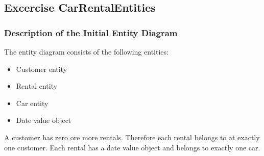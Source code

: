 \label{cha:design_of_data_and_functionality}

\subsection{Excercise CarRentalEntities}
\label{sec:exercise_car_rental_entities}
\subsubsection*{Description of the Initial Entity Diagram}
The entity diagram consists of the following entities:
\begin{itemize}
    \item Customer entity
    \item Rental entity
    \item Car entity
    \item Date value object
\end{itemize}
A customer has zero ore more rentals.
Therefore each rental belongs to at exactly one customer.
Each rental has a date value object and belongs to exactly one car.


